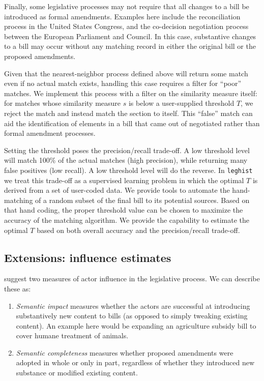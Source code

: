 \documentclass[11pt]{article}
\begin{document}
Finally, some legislative processes may not require that all changes
to a bill be introduced as formal amendments. Examples here include the
reconciliation process in the United States Congress, and the
co-decision negotiation process between the European Parliament and Council. In
this case, substantive changes to a bill may occur without any
matching record in either the original bill or the proposed
amendments. 

Given that the nearest-neighbor process defined above will return some
match even if no actual match exists, handling this case requires a
filter for ``poor'' matches. We implement this process with a filter
on the similarity measure itself: for matches whose similarity
measure $s$ is below a user-supplied threshold $T$, we reject the
match and instead match the section to itself. This ``false'' match
can aid the identification of elements in a bill that
came out of negotiated rather than formal amendment processes. 

Setting the threshold poses the precision/recall trade-off. A low
threshold level will match 100\% of the actual matches (high
precision), while returning many false positives (low recall). A low
threshold level will do the reverse. In \texttt{leghist} we treat this
trade-off as a supervised learning problem in which the optimal $T$ is
derived from a set of user-coded data. We provide tools to automate
the hand-matching of a random subset of the final bill to its
potential sources. Based on that hand coding, the proper threshold
value can be chosen to maximize the accuracy of the matching
algorithm. We provide the capability to estimate the optimal $T$ based
on both overall accuracy and the precision/recall trade-off.

\subsection{Extensions: influence estimates}
\label{sec:extens-infl-estim}

\cite{tsebelis2001legislative} suggest two measures of actor influence
in the legislative process. We can describe these as:

\begin{enumerate}
\item \textit{Semantic impact} measures whether the actors are
  successful at introducing substantively new content to bills (as
  opposed to simply tweaking existing content). An example here would
  be expanding an agriculture subsidy bill to cover humane treatment
  of animals.
\item \textit{Semantic completeness} measures whether proposed
  amendments were adopted in whole or only in part, regardless of
  whether they introduced new substance or modified existing content.
\end{enumerate}
\end{document}
